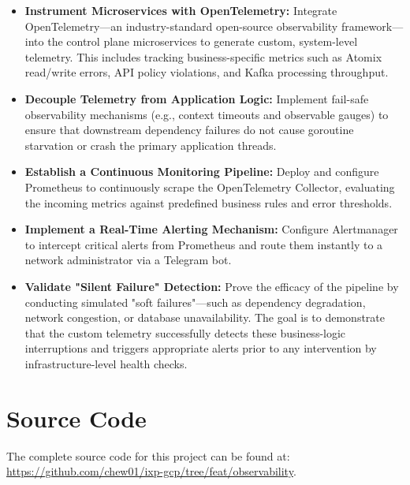 \documentclass[11pt, a4paper]{article}
\begin{document}
\begin{itemize}
    \item \textbf{Instrument Microservices with OpenTelemetry:} Integrate OpenTelemetry—an industry-standard open-source observability framework—into the control plane microservices to generate custom, system-level telemetry. This includes tracking business-specific metrics such as Atomix read/write errors, API policy violations, and Kafka processing throughput.

    \item \textbf{Decouple Telemetry from Application Logic:} Implement fail-safe observability mechanisms (e.g., context timeouts and observable gauges) to ensure that downstream dependency failures do not cause goroutine starvation or crash the primary application threads.

    \item \textbf{Establish a Continuous Monitoring Pipeline:} Deploy and configure Prometheus to continuously scrape the OpenTelemetry Collector, evaluating the incoming metrics against predefined business rules and error thresholds.

    \item \textbf{Implement a Real-Time Alerting Mechanism:} Configure Alertmanager to intercept critical alerts from Prometheus and route them instantly to a network administrator via a Telegram bot.

    \item \textbf{Validate "Silent Failure" Detection:} Prove the efficacy of the pipeline by conducting simulated "soft failures"—such as dependency degradation, network congestion, or database unavailability. The goal is to demonstrate that the custom telemetry successfully detects these business-logic interruptions and triggers appropriate alerts prior to any intervention by infrastructure-level health checks.
\end{itemize}













\clearpage
{} %
\setcounter{page}{\value{romanpages}} %

{}

\newpage
\appendix
\singlespacing
\section{Source Code}
The complete source code for this project can be found at: \url{https://github.com/chew01/ixp-gcp/tree/feat/observability}.
\end{document}
